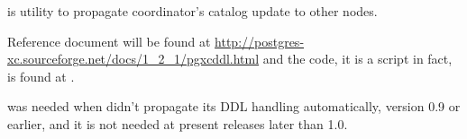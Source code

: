 %
%

   is \XC{} utility to propagate coordinator's catalog update to other nodes.
  
  Reference document will be found at
  \url{http://postgres-xc.sourceforge.net/docs/1_2_1/pgxcddl.html} and the code,
  it is a  script in fact,
  is found at .
  
  
  
   was needed when \XC{} didn't propagate its DDL handling automatically,
  version 0.9 or earlier, and it is not needed at present releases later than 1.0.

